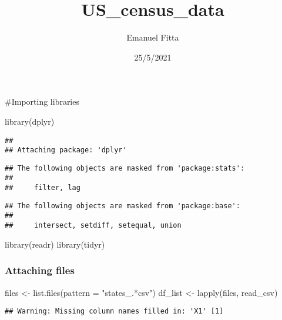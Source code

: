 \documentclass[
]{article}
\title{US\_census\_data}
\author{Emanuel Fitta}
\date{25/5/2021}
\newenvironment{Shaded}{\begin{snugshade}}{\end{snugshade}}
\newcommand{\AttributeTok}[1]{\textcolor[rgb]{0.77,0.63,0.00}{#1}}
\newcommand{\FunctionTok}[1]{\textcolor[rgb]{0.00,0.00,0.00}{#1}}
\newcommand{\NormalTok}[1]{#1}
\newcommand{\OtherTok}[1]{\textcolor[rgb]{0.56,0.35,0.01}{#1}}
\newcommand{\StringTok}[1]{\textcolor[rgb]{0.31,0.60,0.02}{#1}}
\begin{document}
\maketitle

\#Importing libraries

\begin{Shaded}
\begin{Highlighting}[]
\FunctionTok{library}\NormalTok{(dplyr)}
\end{Highlighting}
\end{Shaded}

\begin{verbatim}
## 
## Attaching package: 'dplyr'
\end{verbatim}

\begin{verbatim}
## The following objects are masked from 'package:stats':
## 
##     filter, lag
\end{verbatim}

\begin{verbatim}
## The following objects are masked from 'package:base':
## 
##     intersect, setdiff, setequal, union
\end{verbatim}

\begin{Shaded}
\begin{Highlighting}[]
\FunctionTok{library}\NormalTok{(readr)}
\FunctionTok{library}\NormalTok{(tidyr)}
\end{Highlighting}
\end{Shaded}

\hypertarget{attaching-files}{%
\subsubsection{Attaching files}\label{attaching-files}}

\begin{Shaded}
\begin{Highlighting}[]
\NormalTok{files }\OtherTok{\textless{}{-}} \FunctionTok{list.files}\NormalTok{(}\AttributeTok{pattern =} \StringTok{"states\_.*csv"}\NormalTok{)}
\NormalTok{df\_list }\OtherTok{\textless{}{-}} \FunctionTok{lapply}\NormalTok{(files, read\_csv)}
\end{Highlighting}
\end{Shaded}

\begin{verbatim}
## Warning: Missing column names filled in: 'X1' [1]
\end{verbatim}
\end{document}
